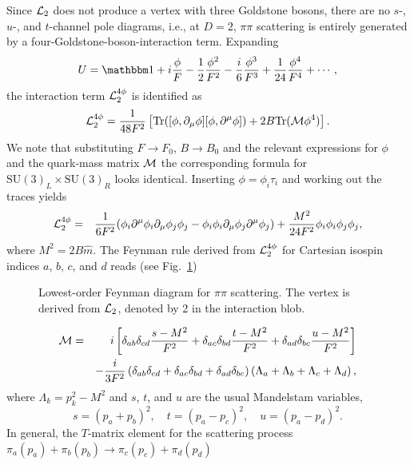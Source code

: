 \documentclass[twoside,12pt]{article}
\begin{document}
   Since ${\cal L}_2$ does not produce a vertex with three Goldstone
bosons, there are no $s$-, $u$-, and $t$-channel pole diagrams, i.e.,
   at $D=2$, $\pi\pi$ scattering is entirely generated by a four-Goldstone-boson-interaction
term.
   Expanding
$$
U={\mathbbm 1}+i\frac{\phi}{F}-\frac{1}{2}\frac{\phi^2}{F^2}-\frac{i}{6}
\frac{\phi^3}{F^3}+\frac{1}{24}\frac{\phi^4}{F^4}+\cdots,
$$
the interaction term ${\cal L}_2^{4\phi}$ is identified as
$$
{\cal L}_2^{4\phi}=\frac{1}{48 F^2}\left[\mbox{Tr}(
[\phi,\partial_\mu \phi][\phi, \partial^\mu \phi])
+2B\mbox{Tr}({\cal M}\phi^4)\right].
$$
   We note that substituting $F\to F_0$, $B\to B_0$ and the
relevant expressions for $\phi$ and the quark-mass matrix $\cal M$
the corresponding formula for $\mbox{SU}(3)_L\times\mbox{SU}(3)_R$ looks identical.
   Inserting  $\phi=\phi_i\tau_i$ and working out the traces yields
\begin{eqnarray*}
{\cal L}^{4\phi}_2
&=&\frac{1}{6F^2}(\phi_i\partial^\mu\phi_i\partial_\mu\phi_j\phi_j
-\phi_i\phi_i\partial_\mu\phi_j\partial^\mu\phi_j) +\frac{M^2}{24
F^2}\phi_i\phi_i\phi_j\phi_j,
\end{eqnarray*}
where $M^2=2 B \hat m$.
   The Feynman rule derived from ${\cal L}^{4\phi}_2$ for Cartesian isospin
indices $a$, $b$, $c$, and $d$ reads (see Fig.\ \ref{3:2:4:pipi:fig})
\begin{figure}[t]
\begin{center}
\caption{\label{3:2:4:pipi:fig} Lowest-order Feynman diagram for
$\pi\pi$ scattering. The vertex is derived from ${\cal L}_2$, denoted by
2 in the interaction blob.}
\end{center}
\end{figure}
\begin{eqnarray}
\label{3:2:4:mpipi} {\cal M}
&=&i\left[\delta_{ab}\delta_{cd}\frac{s-M^2}{F^2}
+\delta_{ac}\delta_{bd}\frac{t-M^2}{F^2}
+\delta_{ad}\delta_{bc}\frac{u-M^2}{F^2}\right]\nonumber\\
&&-\frac{i}{3F^2}
\left(\delta_{ab}\delta_{cd}+\delta_{ac}\delta_{bd}+\delta_{ad}\delta_{bc}
\right) \left(\Lambda_a+\Lambda_b+\Lambda_c+\Lambda_d\right),
\end{eqnarray}
where $\Lambda_k=p_k^2-M^2$ and $s$, $t$, and $u$ are the usual
Mandelstam variables,
\begin{displaymath}
s=(p_a+p_b)^2,\quad t=(p_a-p_c)^2,\quad u=(p_a-p_d)^2.
\end{displaymath}
    In general, the $T$-matrix element for the scattering
process $\pi_a(p_a)+\pi_b(p_b)\to\pi_c(p_c)+\pi_d(p_d)$
\end{document}
